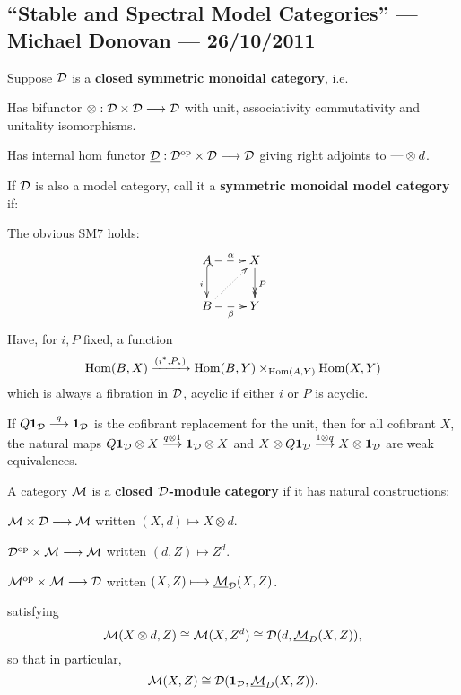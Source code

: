 \documentclass[11pt]{article}
\newcommand{\KanSemResponse}[1]
{
\thispagestyle{fancy}
\subsection*{#1}
}
\begin{document}
\begin{MichaelStableModelCats}
\KanSemResponse
{``Stable and Spectral Model Categories'' --- Michael Donovan --- 26/10/2011}
\begin{itemise}
\item Suppose $\mathcal{D}$ is a \textbf{closed symmetric monoidal category}, i.e.
\begin{itemise}
\item Has bifunctor $\otimes:\mathcal{D}\times\mathcal{D}\longrightarrow\mathcal{D}$ with unit, associativity commutativity and unitality isomorphisms.
\item Has internal hom functor $\underline{\mathcal{D}}:\mathcal{D}^{\textup{op}}\times\mathcal{D}\longrightarrow\mathcal{D}$ giving right adjoints to $\textup{---}\otimes d$.
\end{itemise}
\item If $\mathcal{D}$ is also a model category, call it a \textbf{symmetric monoidal model category} if:
\begin{itemise}
\item The obvious SM7 holds:
\[\xymatrix{
A\ar@{-->}[r]^\alpha\ar@{^{(}->}[d]_i&X\ar@{->>}[d]^P\\
B\ar@{-->}[r]_\beta\ar@{..>}[ur]&Y
}\]
Have, for $i,P$ fixed, a function 
 \[\operatorname{Hom}(B,X)\xrightarrow{(i^*,P_*)}\operatorname{Hom}(B,Y)\times_{\operatorname{Hom}(A,Y)}\operatorname{Hom}(X,Y)\]
which is always a fibration in $\mathcal{D}$, acyclic if either $i$ or $P$ is acyclic. 
\item If $Q\textbf{1}_{\mathcal{D}}\overset{q}{\longrightarrow}\textbf{1}_{\mathcal{D}}$ is the cofibrant replacement for the unit, then for all cofibrant $X$, the natural maps $Q\textbf{1}_{\mathcal{D}}\otimes X\overset{q\otimes1}{\longrightarrow}\textbf{1}_{\mathcal{D}}\otimes X$ and $X\otimes Q\textbf{1}_{\mathcal{D}} \overset{1\otimes q}{\longrightarrow}X\otimes \textbf{1}_{\mathcal{D}}$ are weak equivalences.
\end{itemise}
\item A category $\mathcal{M}$ is a \textbf{closed $\mathcal{D}$-module category} if it has natural constructions:
\begin{itemise}
\item $\mathcal{M}\times \mathcal{D}\longrightarrow\mathcal{M}$ written $(X,d)\mapsto X\otimes d$.
\item $\mathcal{D}^{\textup{op}}\times\mathcal{M}\longrightarrow\mathcal{M}$ written $(d,Z)\mapsto Z^d$.
\item $\mathcal{M}^{\textup{op}}\times\mathcal{M}\longrightarrow\mathcal{D}$ written $(X,Z)\longmapsto \underline{\mathcal{M}}_{\mathcal{D}}(X,Z)$.
\end{itemise}
satisfying
\[\mathcal{M}(X\otimes d,Z)\cong \mathcal{M}(X,Z^d)\cong\mathcal{D}(d,\underline{\mathcal{M}}_D(X,Z)),\]
so that in particular,
\[\mathcal{M}(X,Z)\cong \mathcal{D}(\textbf{1}_{\mathcal{D}},\underline{\mathcal{M}}_D(X,Z)).\]

\end{itemise}
\end{MichaelStableModelCats}
\end{document}
